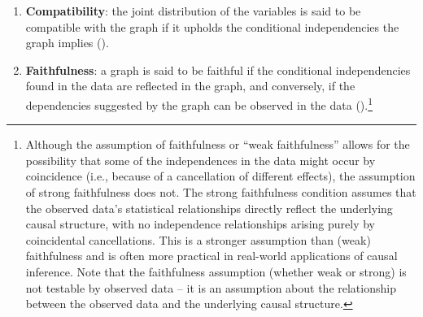 \documentclass[
  singlecolumn]{article}
\begin{document}
\begin{enumerate}
\def\labelenumi{\arabic{enumi}.}
\setcounter{enumi}{7}
\item
  \textbf{Compatibility}: the joint distribution of the variables is
  said to be compatible with the graph if it upholds the conditional
  independencies the graph implies ().
\item
  \textbf{Faithfulness}: a graph is said to be faithful if the
  conditional independencies found in the data are reflected in the
  graph, and conversely, if the dependencies suggested by the graph can
  be observed in the data ().\footnote{Although the assumption of faithfulness or ``weak
    faithfulness'' allows for the possibility that some of the
    independences in the data might occur by coincidence (i.e., because
    of a cancellation of different effects), the assumption of strong
    faithfulness does not. The strong faithfulness condition assumes
    that the observed data's statistical relationships directly reflect
    the underlying causal structure, with no independence relationships
    arising purely by coincidental cancellations. This is a stronger
    assumption than (weak) faithfulness and is often more practical in
    real-world applications of causal inference. Note that the
    faithfulness assumption (whether weak or strong) is not testable by
    observed data -- it is an assumption about the relationship between
    the observed data and the underlying causal structure.}
\end{enumerate}
\end{document}
